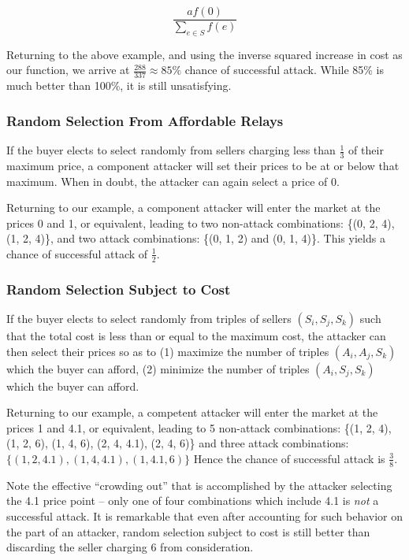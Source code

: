 $$\frac{a f(0)}{\sum_{e \in S} f(e)}$$

Returning to the above example, and using the inverse squared increase
in cost as our function, we arrive at $\frac{288}{337} \approx 85\%$
chance of successful attack. While 85\% is much better than 100\%, it
is still unsatisfying.

\subsubsection*{Random Selection From Affordable Relays}

If the buyer elects to select randomly from sellers charging less than
$\frac{1}{3}$ of their maximum price, a component attacker will set
their prices to be at or below that maximum. When in doubt, the
attacker can again select a price of 0.

Returning to our example, a component attacker will enter the market
at the prices 0 and 1, or equivalent, leading to two non-attack
combinations: \{(0, 2, 4), (1, 2, 4)\}, and two attack combinations:
\{(0, 1, 2) and (0, 1, 4)\}. This yields a chance of successful attack
of $\frac{1}{2}$.

\subsubsection*{Random Selection Subject to Cost}
\label{best-auction-strat}

If the buyer elects to select randomly from triples of sellers $(S_i,
S_j, S_k)$ such that the total cost is less than or equal to the
maximum cost, the attacker can then select their prices so as to (1)
maximize the number of triples $(A_i, A_j, S_k)$ which the buyer can
afford, (2) minimize the number of triples $(A_i, S_j, S_k)$ which the
buyer can afford.

Returning to our example, a competent attacker will enter the market
at the prices 1 and 4.1, or equivalent, leading to 5 non-attack
combinations: \{(1, 2, 4), (1, 2, 6), (1, 4, 6), (2, 4, 4.1), (2, 4,
6)\} and three attack combinations: $\{(1, 2, 4.1), (1, 4, 4.1), (1,
4.1, 6)\}$ Hence the chance of successful attack is $\frac{3}{8}$.

Note the effective ``crowding out'' that is accomplished by the
attacker selecting the 4.1 price point -- only one of four
combinations which include 4.1 is \emph{not} a successful attack. It
is remarkable that even after accounting for such behavior on the part
of an attacker, random selection subject to cost is still better than
discarding the seller charging 6 from consideration.

